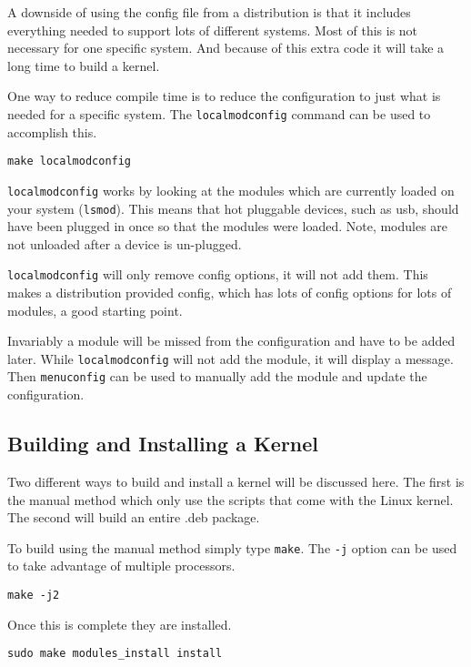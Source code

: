 \documentclass{article}
\begin{document}
A downside of using the config file from a distribution is that it
includes everything needed to support lots of different systems.  Most
of this is not necessary for one specific system.  And because of this
extra code it will take a long time to build a kernel.

One way to reduce compile time is to reduce the configuration to just
what is needed for a specific system.
The \verb+localmodconfig+ command\autocite{kconfig} can be used to
accomplish this.

\begin{verbatim}
make localmodconfig
\end{verbatim}

\verb+localmodconfig+ works by looking at the modules which are currently
loaded on your system (\verb+lsmod+).  This means that hot pluggable devices,
such as usb, should have been plugged in once so that the modules were
loaded.  Note, modules are not unloaded after a device is un-plugged.

\verb+localmodconfig+ will only remove config options, it will not add them.
This makes a distribution provided config, which has lots of config
options for lots of modules, a good starting point.

Invariably a module will be missed from the configuration and have to be
added later.  While \verb+localmodconfig+ will not add the module, it will
display a message.  Then \verb+menuconfig+ can be used to manually add the
module and update the configuration.

\subsection{Building and Installing a Kernel}

Two different ways to build and install a kernel will be discussed here.
The first is the manual method which only use the scripts that come with
the Linux kernel.  The second will build an entire .deb package.

To build using the manual method simply type \verb+make+.  The \verb+-j+ option
can be used to take advantage of multiple processors.

\begin{verbatim}
make -j2
\end{verbatim}

Once this is complete they are installed.

\begin{verbatim}
sudo make modules_install install
\end{verbatim}
\end{document}

